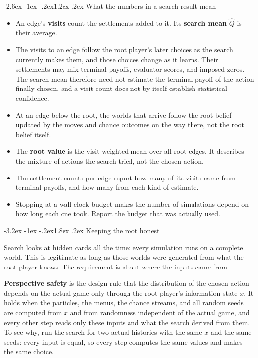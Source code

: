 \documentclass[11pt,a4paper]{article}
\makeatletter
\renewcommand\section{\@startsection{section}{1}{\z@}
  {-3.2ex \@plus -1ex \@minus -.2ex}{1.8ex \@plus .2ex}
  {\normalfont\Large\sffamily\bfseries\color{ink}}}
\renewcommand\subsection{\@startsection{subsection}{2}{\z@}
  {-2.6ex \@plus -1ex \@minus -.2ex}{1.2ex \@plus .2ex}
  {\normalfont\large\sffamily\bfseries\color{ink}}}
\theoremstyle{plain}
\theoremstyle{definition}
\newcommand{\term}[1]{\textbf{#1}}
\makeatother
\begin{document}
\subsection{What the numbers in a search result mean}

\begin{itemize}
\item An edge's \term{visits} count the settlements added to it. Its
  \term{search mean} $\widehat Q$ is their average.
\item The visits to an edge follow the root player's later choices as the
  search currently makes them, and those choices change as it learns. Their
  settlements may mix terminal payoffs, evaluator scores, and imposed zeros.
  The search mean therefore need not estimate the terminal payoff of the
  action finally chosen, and a visit count does not by itself establish
  statistical confidence.
\item At an edge below the root, the worlds that arrive follow the root belief
  updated by the moves and chance outcomes on the way there, not the root
  belief itself.
\item The \term{root value} is the visit-weighted mean over all root edges. It
  describes the mixture of actions the search tried, not the chosen action.
\item The settlement counts per edge report how many of its visits came from
  terminal payoffs, and how many from each kind of estimate.
\item Stopping at a wall-clock budget makes the number of simulations depend
  on how long each one took. Report the budget that was actually used.
\end{itemize}

\section{Keeping the root honest}
\label{sec:safety}

Search looks at hidden cards all the time: every simulation runs on a
complete world. This is legitimate as long as those worlds were generated
from what the root player knows. The requirement is about where the
inputs came from.

\term{Perspective safety} is the design rule that the distribution of the
chosen action depends on the actual game only through the root player's
information state $x$. It holds when the particles, the menus, the chance
streams, and all random seeds are computed from $x$ and from randomness
independent of the actual game, and every other step reads only these inputs
and what the search derived from them. To see why, run the search for two
actual histories with the same $x$ and the same seeds: every input is equal,
so every step computes the same values and makes the same choice.
\end{document}

